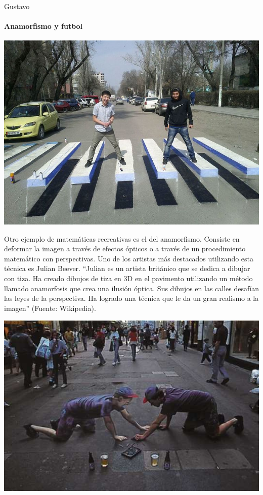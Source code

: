 \begin{opin}{\guscolor}{Gustavo}
\begin{leftbar}{\guscolor}
 

\paragraph{Anamorfismo y futbol\\}
 

\begin{minipage}[h]{1\linewidth}
	\centering
	\includegraphics[width=0.7\linewidth]{img/anamorf1.jpg}
\end{minipage}
 
Otro ejemplo de matemáticas recreativas es el del anamorfismo. Consiste en deformar la imagen a través de efectos ópticos o a través de un procedimiento matemático con perspectivas. Uno de los artistas más destacados utilizando esta técnica es Julian Beever. “Julian es un artista británico que se dedica a dibujar con tiza. Ha creado dibujos de tiza en 3D en el pavimento utilizando un método llamado anamorfosis que crea una ilusión óptica. Sus dibujos en las calles desafían las leyes de la perspectiva. Ha logrado una técnica que le da un gran realismo a la imagen” (Fuente: Wikipedia).

\begin{minipage}[h]{1\linewidth}
	\centering
	\includegraphics[width=0.7\linewidth]{img/anamorf2.jpg}
	

\end{minipage}
\end{leftbar}
\end{opin}
